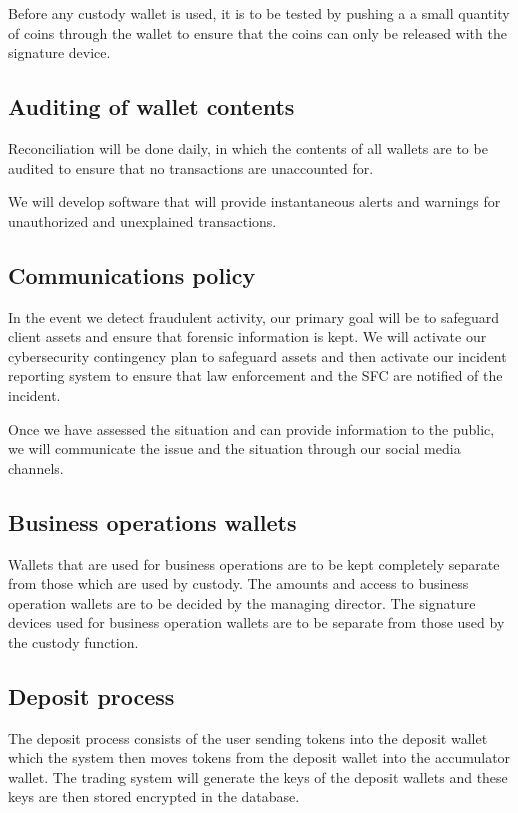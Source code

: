 Before any custody wallet is used, it is to be tested by pushing a
a small quantity of coins through the wallet to ensure that the coins can
only be released with the signature device.

\subsection{Auditing of wallet contents}

Reconciliation will be done daily, in which the contents of
all wallets are to be audited to ensure that no transactions are
unaccounted for.

We will develop software that will provide instantaneous alerts and
warnings for unauthorized and unexplained transactions.

\subsection{Communications policy}
In the event we detect fraudulent activity, our primary goal will be to
safeguard client assets and ensure that forensic information is kept.
We will activate our cybersecurity contingency plan to safeguard
assets and then activate our incident reporting system to ensure that
law enforcement and the SFC are notified of the incident.

Once we have assessed the situation and can provide
information to the public, we will communicate the issue and the
situation through our social media channels.

\subsection{Business operations wallets}

Wallets that are used for business operations are to be kept
completely separate from those which are used by custody.  The amounts
and access to business operation wallets are to be decided by the
managing director.  The signature devices used for business operation
wallets are to be separate from those used by the custody function.

\subsection{Deposit process}
The deposit process consists of the user sending tokens into the
deposit wallet which the system then moves tokens from the deposit
wallet into the accumulator wallet.  The trading system will generate
the keys of the deposit wallets and these keys are then stored encrypted
in the database.

